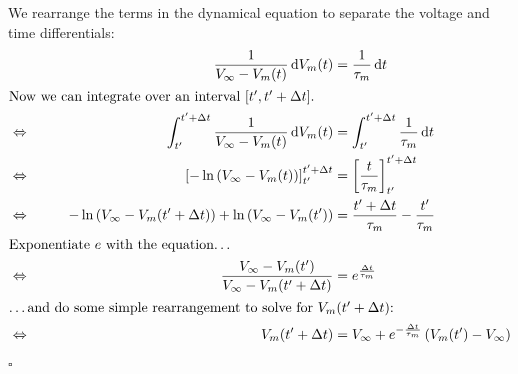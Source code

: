 \documentclass{scrartcl}
\newcommand*\diff{\mathop{}\!\mathrm{d}}
\begin{document}
We rearrange the terms in the dynamical equation to separate the voltage and time differentials:
\begin{alignat*}{2}
& &\frac{1}{V_\infty - V_m(t)} \diff V_m(t) &= \frac{1}{\tau_m} \diff t\\
\shortintertext{Now we can integrate over an interval $[t', t'+\Delta t]$.}
&\Leftrightarrow \qquad & \int_{t'}^{t'+\Delta t} \frac{1}{V_\infty - V_m(t)}\diff V_m(t) &= \int_{t'}^{t'+\Delta t} \frac{1}{\tau_m} \diff t\\
&\Leftrightarrow \qquad & \left[-\ln{\left(V_\infty - V_m(t)\right)} \right]_{t'}^{t'+\Delta t} &= \left[\frac{t}{\tau_m} \right]_{t'}^{t'+\Delta t}\\
&\Leftrightarrow \qquad & -\ln{\left(V_\infty - V_m(t'+\Delta t)\right)} + \ln{\left(V_\infty - V_m(t')\right)} &= \frac{t'+\Delta t}{\tau_m} - \frac{t'}{\tau_m}\\
\shortintertext{Exponentiate $e$ with the equation\dots}
&\Leftrightarrow \qquad & \frac{V_\infty - V_m(t')}{V_\infty - V_m(t'+\Delta t)} &= e^\frac{\Delta t}{\tau_m}\\
\shortintertext{\dots and do some simple rearrangement to solve for $V_m(t'+\Delta t)$:}
&\Leftrightarrow \qquad & V_m(t'+\Delta t) &= V_\infty + e^{-\frac{\Delta t}{\tau_m}}\left( V_m(t') - V_\infty \right)
\end{alignat*}
\hfill $\square$
\end{document}
